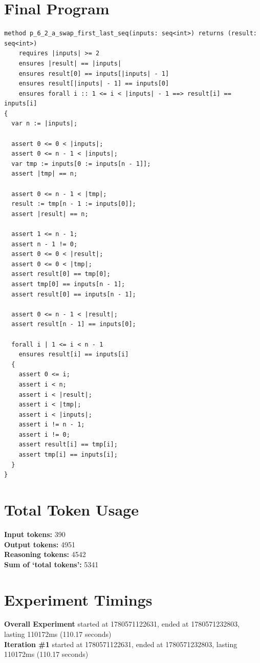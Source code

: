 \documentclass{article}
\begin{document}
\section*{Final Program}
\begin{lstlisting}
method p_6_2_a_swap_first_last_seq(inputs: seq<int>) returns (result: seq<int>)
	requires |inputs| >= 2
	ensures |result| == |inputs|
	ensures result[0] == inputs[|inputs| - 1]
	ensures result[|inputs| - 1] == inputs[0]
	ensures forall i :: 1 <= i < |inputs| - 1 ==> result[i] == inputs[i]
{
  var n := |inputs|;

  assert 0 <= 0 < |inputs|;
  assert 0 <= n - 1 < |inputs|;
  var tmp := inputs[0 := inputs[n - 1]];
  assert |tmp| == n;

  assert 0 <= n - 1 < |tmp|;
  result := tmp[n - 1 := inputs[0]];
  assert |result| == n;

  assert 1 <= n - 1;
  assert n - 1 != 0;
  assert 0 <= 0 < |result|;
  assert 0 <= 0 < |tmp|;
  assert result[0] == tmp[0];
  assert tmp[0] == inputs[n - 1];
  assert result[0] == inputs[n - 1];

  assert 0 <= n - 1 < |result|;
  assert result[n - 1] == inputs[0];

  forall i | 1 <= i < n - 1
    ensures result[i] == inputs[i]
  {
    assert 0 <= i;
    assert i < n;
    assert i < |result|;
    assert i < |tmp|;
    assert i < |inputs|;
    assert i != n - 1;
    assert i != 0;
    assert result[i] == tmp[i];
    assert tmp[i] == inputs[i];
  }
}
\end{lstlisting}
\section*{Total Token Usage}
\textbf{Input tokens: }390
\\\textbf{Output tokens: }4951
\\\textbf{Reasoning tokens: }4542
\\\textbf{Sum of `total tokens': }5341
\section*{Experiment Timings}
\textbf{Overall Experiment} started at 1780571122631, ended at 1780571232803, lasting 110172ms (110.17 seconds)
\\\textbf{Iteration \#1} started at 1780571122631, ended at 1780571232803, lasting 110172ms (110.17 seconds)
\end{document}
